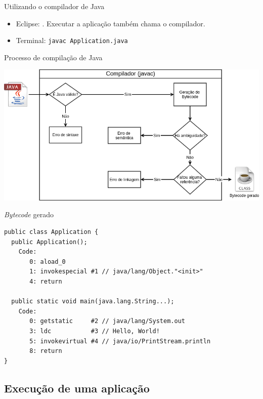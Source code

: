 \documentclass{beamer}
\newcommand{\icon}[1]{\raisebox{-.2\height}{\texttt{[image: \#1]}}}
\begin{document}
\begin{frame}{Utilizando o compilador de Java}
    \begin{itemize}
        \item[] \icon{eclipse} Eclipse: .
            Executar a aplicação também chama o compilador.
        \item[] \icon{terminal} Terminal: \texttt{javac Application.java}
    \end{itemize}
\end{frame}


\begin{frame}{Processo de compilação de Java}
    \begin{center}
        \includegraphics[keepaspectratio,width=1\textwidth,height=1\textheight]{compilation_scheme}
    \end{center}
\end{frame}


\begin{frame}[fragile]{\textit{Bytecode} gerado}
    \begin{verbatim}
public class Application {
  public Application();
    Code:
       0: aload_0
       1: invokespecial #1 // java/lang/Object."<init>"
       4: return

  public static void main(java.lang.String...);
    Code:
       0: getstatic     #2 // java/lang/System.out
       3: ldc           #3 // Hello, World!
       5: invokevirtual #4 // java/io/PrintStream.println
       8: return
}
    \end{verbatim}
\end{frame}


\subsection{Execução de uma aplicação}
\end{document}
